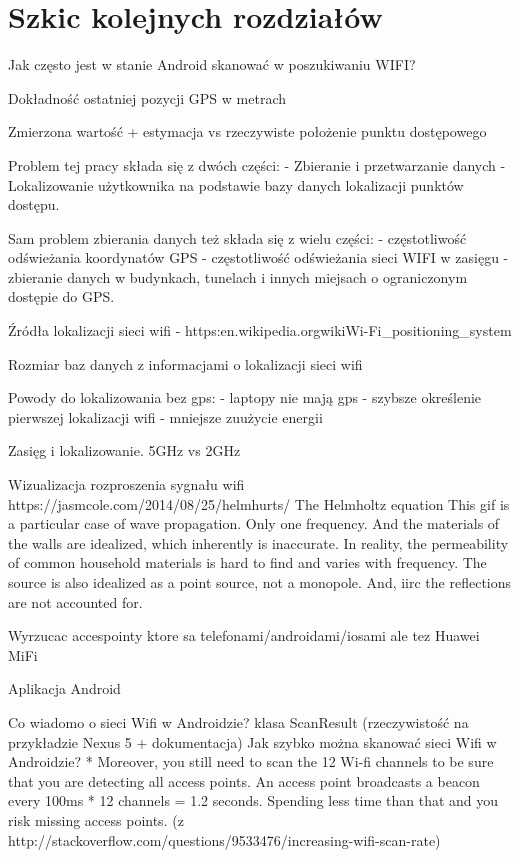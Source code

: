 \chapter{Szkic kolejnych rozdziałów}


Jak często jest w stanie Android skanować w poszukiwaniu WIFI?

Dokładność ostatniej pozycji GPS w metrach

Zmierzona wartość + estymacja vs rzeczywiste położenie punktu dostępowego

Problem tej pracy składa się z dwóch części:
 - Zbieranie i przetwarzanie danych
 - Lokalizowanie użytkownika na podstawie bazy danych lokalizacji punktów dostępu.
 
Sam problem zbierania danych też składa się z wielu części:
 - częstotliwość odświeżania koordynatów GPS
 - częstotliwość odświeżania sieci WIFI w zasięgu
 - zbieranie danych w budynkach, tunelach i innych miejsach o ograniczonym dostępie do GPS.
 

Źródła lokalizacji sieci wifi - https:\/\/en.wikipedia.org\/wiki\/Wi-Fi\_positioning\_system

Rozmiar baz danych z informacjami o lokalizacji sieci wifi

Powody do lokalizowania bez gps:
 - laptopy nie mają gps
 - szybsze określenie pierwszej lokalizacji wifi
 - mniejsze zuużycie energii
 
Zasięg i lokalizowanie. 5GHz vs 2GHz

Wizualizacja rozproszenia sygnału wifi
https://jasmcole.com/2014/08/25/helmhurts/
The Helmholtz equation
This gif is a particular case of wave propagation. Only one frequency. And the materials of the walls are idealized, which inherently is inaccurate. In reality, the permeability of common household materials is hard to find and varies with frequency. The source is also idealized as a point source, not a monopole. And, iirc the reflections are not accounted for. 


Wyrzucac accespointy ktore sa telefonami/androidami/iosami ale tez Huawei MiFi

Aplikacja Android

    Co wiadomo o sieci Wifi w Androidzie? klasa ScanResult (rzeczywistość na przykładzie Nexus 5 + dokumentacja)
    Jak szybko można skanować sieci Wifi w Androidzie? * Moreover, you still need to scan the 12 Wi-fi channels to be sure that you are detecting all access points. An access point broadcasts a beacon every 100ms * 12 channels = 1.2 seconds. Spending less time than that and you risk missing access points. (z http://stackoverflow.com/questions/9533476/increasing-wifi-scan-rate)
    

